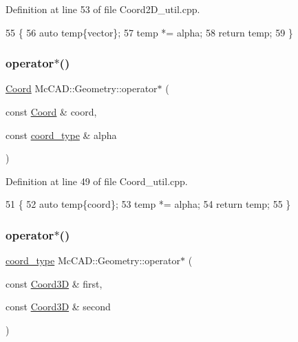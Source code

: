 Definition at line 53 of file Coord2\+D\+\_\+util.\+cpp.


\begin{DoxyCode}
55                                 \{
56     \textcolor{keyword}{auto} temp\{vector\};
57     temp *= alpha;
58     \textcolor{keywordflow}{return} temp;
59 \}
\end{DoxyCode}
\mbox{\label{namespaceMcCAD_1_1Geometry_a0eaa8243403834b30fee65967799773f}} 
\subsubsection{\texorpdfstring{operator$\ast$()}{operator*()}\hspace{0.1cm}{\footnotesize\ttfamily [6/9]}}
{\footnotesize\ttfamily \hyperlink{classMcCAD_1_1Geometry_1_1Coord}{Coord} Mc\+C\+A\+D\+::\+Geometry\+::operator$\ast$ (\begin{DoxyParamCaption}\item[{const \hyperlink{classMcCAD_1_1Geometry_1_1Coord}{Coord} \&}]{coord,  }\item[{const \hyperlink{namespaceMcCAD_1_1Geometry_ac043b37a4a7e849fca22869e1982d2f8}{coord\+\_\+type} \&}]{alpha }\end{DoxyParamCaption})}



Definition at line 49 of file Coord\+\_\+util.\+cpp.


\begin{DoxyCode}
51                                 \{
52     \textcolor{keyword}{auto} temp\{coord\};
53     temp *= alpha;
54     \textcolor{keywordflow}{return} temp;
55 \}
\end{DoxyCode}
\mbox{\label{namespaceMcCAD_1_1Geometry_a061152d1567c0497110e721833719457}} 
\subsubsection{\texorpdfstring{operator$\ast$()}{operator*()}\hspace{0.1cm}{\footnotesize\ttfamily [7/9]}}
{\footnotesize\ttfamily \hyperlink{namespaceMcCAD_1_1Geometry_ac043b37a4a7e849fca22869e1982d2f8}{coord\+\_\+type} Mc\+C\+A\+D\+::\+Geometry\+::operator$\ast$ (\begin{DoxyParamCaption}\item[{const \hyperlink{classMcCAD_1_1Geometry_1_1Coord3D}{Coord3D} \&}]{first,  }\item[{const \hyperlink{classMcCAD_1_1Geometry_1_1Coord3D}{Coord3D} \&}]{second }\end{DoxyParamCaption})}



